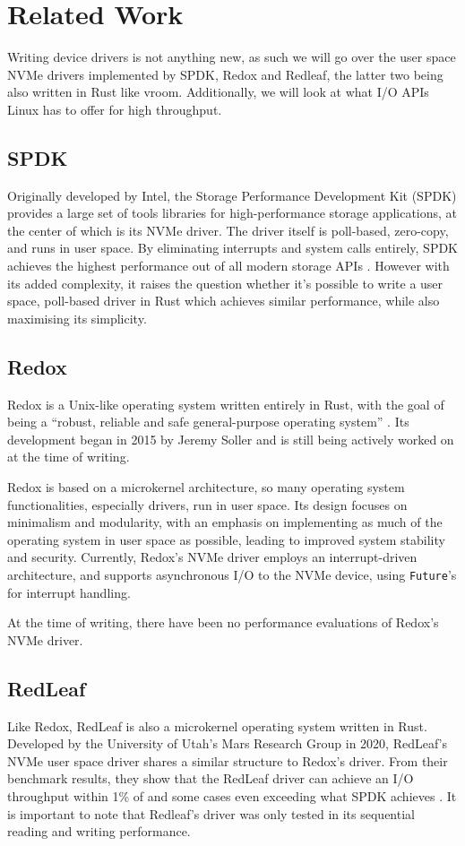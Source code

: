 \chapter{Related Work}\label{chapter:related}
Writing device drivers is not anything new, as such we will go over the user space NVMe drivers implemented by SPDK, Redox and Redleaf, the latter two being also written in Rust like vroom. Additionally, we will look at what I/O APIs Linux has to offer for high throughput.

\section{SPDK}
Originally developed by Intel, the Storage Performance Development Kit (SPDK) provides a large set of tools libraries for high-performance storage applications, at the center of which is its NVMe driver. The driver itself is poll-based, zero-copy, and runs in user space. By eliminating interrupts and system calls entirely, SPDK achieves the highest performance out of all modern storage APIs \cite{storage_api}. However with its added complexity, it raises the question whether it's possible to write a user space, poll-based driver in Rust which achieves similar performance, while also maximising its simplicity.

\section{Redox}
Redox is a Unix-like operating system written entirely in Rust, with the goal of being a ``robust, reliable and safe general-purpose operating system'' \cite{redox}. Its development began in 2015 by Jeremy Soller and is still being actively worked on at the time of writing.

Redox is based on a microkernel architecture, so many operating system functionalities, especially drivers, run in user space. Its design focuses on minimalism and modularity, with an emphasis on implementing as much of the operating system in user space as possible, leading to improved system stability and security. Currently, Redox's NVMe driver employs an interrupt-driven architecture, and supports asynchronous I/O to the NVMe device, using \texttt{Future}'s for interrupt handling.

At the time of writing, there have been no performance evaluations of Redox's NVMe driver.

\section{RedLeaf}
Like Redox, RedLeaf \cite{redleaf-page} is also a microkernel operating system written in Rust. Developed by the University of Utah's Mars Research Group in 2020, RedLeaf's NVMe user space driver shares a similar structure to Redox's driver. From their benchmark results, they show that the RedLeaf driver can achieve an I/O throughput within 1\% of and some cases even exceeding what SPDK achieves \cite{redleaf}. It is important to note that Redleaf's driver was only tested in its sequential reading and writing performance.


